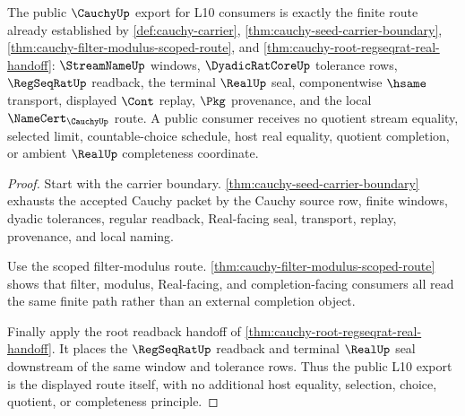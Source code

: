 \begin{theorem}
\label{thm:cauchy-public-l10-export}
The public $\CauchyUp$ export for L10 consumers is exactly the finite route already established by \autoref{def:cauchy-carrier}, \autoref{thm:cauchy-seed-carrier-boundary}, \autoref{thm:cauchy-filter-modulus-scoped-route}, and \autoref{thm:cauchy-root-regseqrat-real-handoff}: $\StreamNameUp$ windows, $\DyadicRatCoreUp$ tolerance rows, $\RegSeqRatUp$ readback, the terminal $\RealUp$ seal, componentwise $\hsame$ transport, displayed $\Cont$ replay, $\Pkg$ provenance, and the local $\NameCert_{\CauchyUp}$ route. A public consumer receives no quotient stream equality, selected limit, countable-choice schedule, host real equality, quotient completion, or ambient $\RealUp$ completeness coordinate.
\end{theorem}
\begin{proof}
Start with the carrier boundary. \autoref{thm:cauchy-seed-carrier-boundary} exhausts the accepted Cauchy packet by the Cauchy source row, finite windows, dyadic tolerances, regular readback, Real-facing seal, transport, replay, provenance, and local naming.

Use the scoped filter-modulus route. \autoref{thm:cauchy-filter-modulus-scoped-route} shows that filter, modulus, Real-facing, and completion-facing consumers all read the same finite path rather than an external completion object.

Finally apply the root readback handoff of \autoref{thm:cauchy-root-regseqrat-real-handoff}. It places the $\RegSeqRatUp$ readback and terminal $\RealUp$ seal downstream of the same window and tolerance rows. Thus the public L10 export is the displayed route itself, with no additional host equality, selection, choice, quotient, or completeness principle.
\end{proof}
